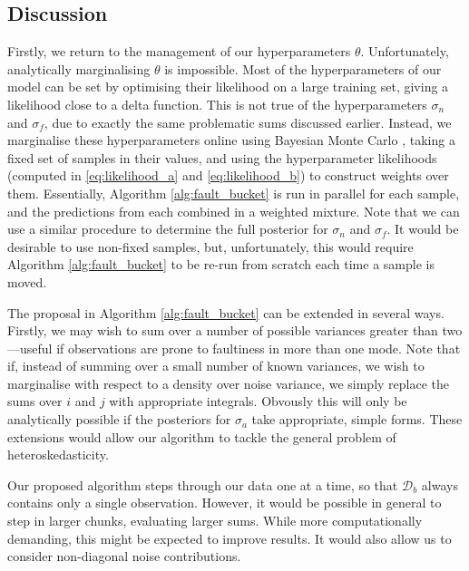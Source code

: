 \documentclass{article}
\newcommand{\cm}[1]{\ensuremath{\mathcal{#1}}}
\newcommand{\data}{\ensuremath{\cm{D}}}
\begin{document}

\subsection{Discussion}

Firstly, we return to the management of our hyperparameters
$\theta$. Unfortunately, analytically marginalising $\theta$ is
impossible. Most of the hyperparameters of our model can be set by
optimising their likelihood on a large training set, giving a
likelihood close to a delta function. This is not true of the
hyperparameters $\sigma_n$ and $\sigma_f$, due to exactly the same
problematic sums discussed earlier. Instead, we marginalise these
hyperparameters online using Bayesian Monte Carlo \citep[Chapter
  7]{osbornebayesian}, taking a fixed set of samples in their values,
and using the hyperparameter likelihoods (computed in
\eqref{eq:likelihood_a} and \eqref{eq:likelihood_b}) to construct
weights over them. Essentially, Algorithm \ref{alg:fault_bucket} is
run in parallel for each sample, and the predictions from each
combined in a weighted mixture. Note that we can use a similar
procedure \citep{garnettosborne} to determine the full posterior for
$\sigma_n$ and $\sigma_f$.  It would be desirable to use non-fixed
samples, but, unfortunately, this would require Algorithm
\ref{alg:fault_bucket} to be re-run from scratch each time a sample is
moved.

The proposal in Algorithm \ref{alg:fault_bucket} can be extended in
several ways. Firstly, we may wish to sum over a number of possible
variances greater than two---useful if observations are prone to
faultiness in more than one mode.  Note that if, instead of summing
over a small number of known variances, we wish to marginalise with
respect to a density over noise variance, we simply replace the sums
over $i$ and $j$ with appropriate integrals. Obvously this will only
be analytically possible if the posteriors for $\sigma_a$ take
appropriate, simple forms.  These extensions would allow our algorithm
to tackle the general problem of heteroskedasticity.

Our proposed algorithm steps through our data one at a time, so that
$\data_b$ always contains only a single observation. However, it would
be possible in general to step in larger chunks, evaluating larger
sums. While more computationally demanding, this might be expected to
improve results. It would also allow us to consider non-diagonal noise
contributions.
\end{document}
